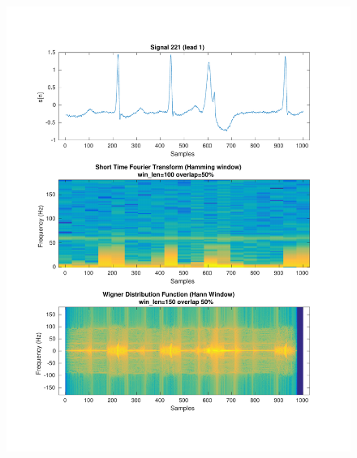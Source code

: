 \documentclass[11pt,a4paper]{article}
\begin{document}
\begin{figure}[H]
\centering
\begin{minipage}{0.48\textwidth}
	\centering
	\includegraphics[width=\textwidth]{fig/221l1_stft_wdf.pdf}
	

\end{minipage}
\end{figure}
\end{document}
